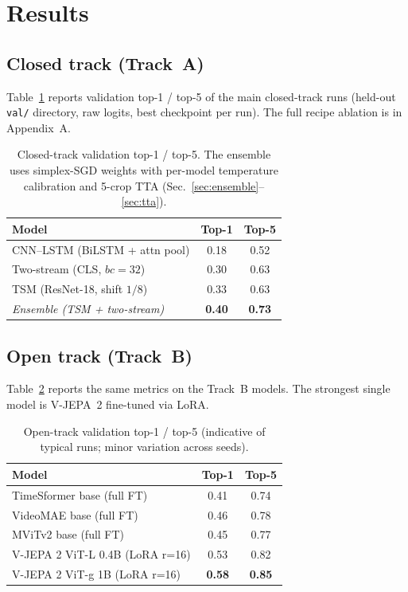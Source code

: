 \documentclass[10pt,twocolumn,letterpaper]{article}
\begin{document}
\section{Results}

\subsection{Closed track (Track~A)}

Table~\ref{tab:closed} reports validation top-1 / top-5 of the main
closed-track runs (held-out \texttt{val/} directory, raw logits, best
checkpoint per run). The full recipe ablation is in Appendix~A.

\begin{table}[h]
\centering
\small
\begin{tabular}{lcc}
\toprule
\textbf{Model} & \textbf{Top-1} & \textbf{Top-5} \\
\midrule
CNN--LSTM (BiLSTM + attn pool)   & 0.18 & 0.52 \\
Two-stream (CLS, $bc{=}32$)      & 0.30 & 0.63 \\
TSM (ResNet-18, shift $1/8$)     & 0.33 & 0.63 \\
\midrule
\textit{Ensemble (TSM + two-stream)} & \textbf{0.40} & \textbf{0.73} \\
\bottomrule
\end{tabular}
\caption{Closed-track validation top-1 / top-5. The ensemble uses
simplex-SGD weights with per-model temperature calibration and 5-crop
TTA (Sec.~\ref{sec:ensemble}--\ref{sec:tta}).}
\label{tab:closed}
\end{table}

\subsection{Open track (Track~B)}

Table~\ref{tab:open} reports the same metrics on the Track~B models.
The strongest single model is V-JEPA~2 fine-tuned via LoRA.

\begin{table}[h]
\centering
\small
\begin{tabular}{lcc}
\toprule
\textbf{Model} & \textbf{Top-1} & \textbf{Top-5} \\
\midrule
TimeSformer base (full FT)            & 0.41 & 0.74 \\
VideoMAE base (full FT)               & 0.46 & 0.78 \\
MViTv2 base (full FT)                 & 0.45 & 0.77 \\
V-JEPA 2 ViT-L 0.4B (LoRA r=16)       & 0.53 & 0.82 \\
V-JEPA 2 ViT-g 1B (LoRA r=16)         & \textbf{0.58} & \textbf{0.85} \\
\bottomrule
\end{tabular}
\caption{Open-track validation top-1 / top-5 (indicative of typical
runs; minor variation across seeds).}
\label{tab:open}
\end{table}
\end{document}
